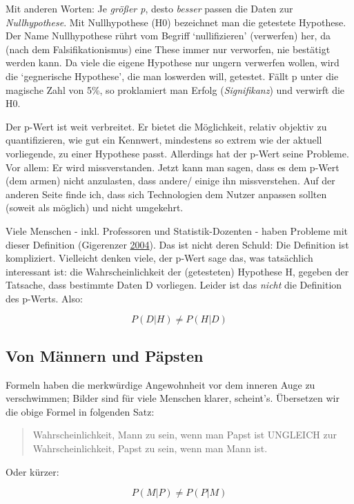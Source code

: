 \documentclass[12pt,ngerman,]{book}
\theoremstyle{definition}
\theoremstyle{definition}
\theoremstyle{remark}
\begin{document}
Mit anderen Worten: Je \emph{größer p}, desto \emph{besser} passen die
Daten zur \emph{Nullhypothese}. Mit Nullhypothese
(H0) bezeichnet man die getestete Hypothese. Der Name Nullhypothese
rührt vom Begriff `nullifizieren' (verwerfen) her, da (nach dem
Falsifikationismus) eine These immer nur verworfen, nie bestätigt werden
kann. Da viele die eigene Hypothese nur ungern verwerfen wollen, wird
die `gegnerische Hypothese', die man loswerden will, getestet. Fällt p
unter die magische Zahl von 5\%, so proklamiert man Erfolg
(\emph{Signifikanz}) und verwirft die H0.

Der p-Wert ist weit verbreitet. Er bietet die Möglichkeit, relativ
objektiv zu quantifizieren, wie gut ein Kennwert, mindestens so extrem
wie der aktuell vorliegende, zu einer Hypothese passt. Allerdings hat
der p-Wert seine Probleme. Vor allem: Er wird missverstanden. Jetzt kann
man sagen, dass es dem p-Wert (dem armen) nicht anzulasten, dass andere/
einige ihn missverstehen. Auf der anderen Seite finde ich, dass sich
Technologien dem Nutzer anpassen sollten (soweit als möglich) und nicht
umgekehrt.

Viele Menschen - inkl. Professoren und Statistik-Dozenten - haben
Probleme mit dieser Definition (Gigerenzer
\protect\hyperlink{ref-Gigerenzer2004}{2004}). Das ist nicht deren
Schuld: Die Definition ist kompliziert. Vielleicht denken viele, der
p-Wert sage das, was tatsächlich interessant ist: die Wahrscheinlichkeit
der (getesteten) Hypothese H, gegeben der Tatsache, dass bestimmte Daten
D vorliegen. Leider ist das \emph{nicht} die Definition des p-Werts.
Also:

\[ P(D|H) \ne P(H|D) \]

\subsection{Von Männern und Päpsten}\label{von-mannern-und-papsten}

Formeln haben die merkwürdige Angewohnheit vor dem inneren Auge zu
verschwimmen; Bilder sind für viele Menschen klarer, scheint's.
Übersetzen wir die obige Formel in folgenden Satz:

\begin{quote}
Wahrscheinlichkeit, Mann zu sein, wenn man Papst ist UNGLEICH zur
Wahrscheinlichkeit, Papst zu sein, wenn man Mann ist.
\end{quote}

Oder kürzer:

\[ P(M|P) \ne P(P|M) \]
\end{document}
